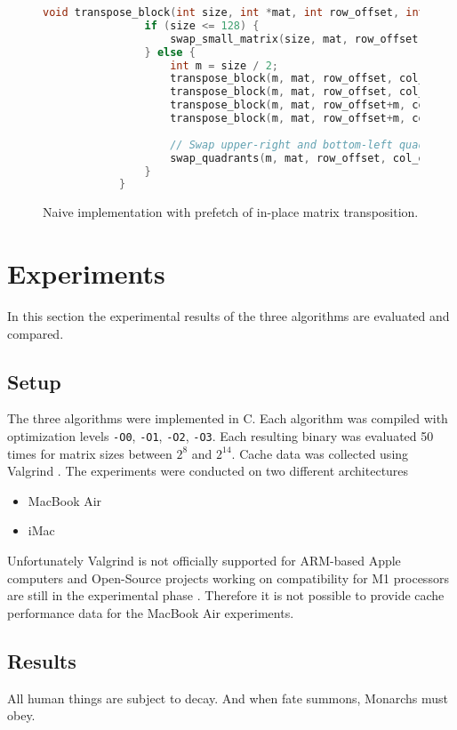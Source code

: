 \documentclass{scrartcl}
\begin{document}
    \begin{figure}
        \begin{lstlisting}[language=C]
            void transpose_block(int size, int *mat, int row_offset, int col_offset) {
                if (size <= 128) {
                    swap_small_matrix(size, mat, row_offset, col_offset);
                } else {
                    int m = size / 2;
                    transpose_block(m, mat, row_offset, col_offset);
                    transpose_block(m, mat, row_offset, col_offset+m);
                    transpose_block(m, mat, row_offset+m, col_offset);
                    transpose_block(m, mat, row_offset+m, col_offset+m);
            
                    // Swap upper-right and bottom-left quadrants
                    swap_quadrants(m, mat, row_offset, col_offset);
                }
            }
        \end{lstlisting}
        \caption{Naive implementation with prefetch of in-place matrix transposition.}
        \label{fig:rec_implementation}        
    \end{figure}

    \section{Experiments} \label{sec:experiments}
    In this section the experimental results of the three algorithms are evaluated and compared.
    \subsection{Setup}
    The three algorithms were implemented in C. Each algorithm was compiled with optimization levels \texttt{-O0}, \texttt{-O1}, \texttt{-O2}, \texttt{-O3}. Each resulting binary was evaluated 50 times for matrix sizes between $2^8$ and $2^{14}$. Cache data was collected using Valgrind \cite{valgrind}. The experiments were conducted on two different architectures
    \begin{itemize}
        \item MacBook Air 
        \item iMac 
    \end{itemize}
    Unfortunately Valgrind is not officially supported for ARM-based Apple computers \cite{valgrinddocs} and Open-Source projects working on compatibility for M1 processors are still in the experimental phase \cite{valgrindm1bug}. Therefore it is not possible to provide cache performance data for the MacBook Air experiments. 

    \subsection{Results}
    All human things are subject to decay. And when fate summons, Monarchs must obey.

    \newpage
    \printbibliography
\end{document}
